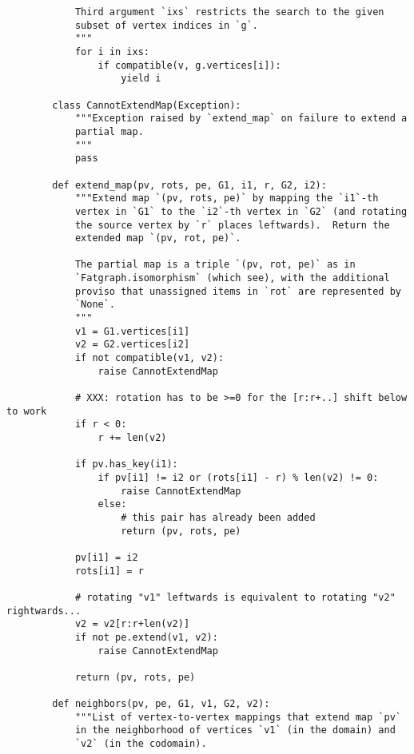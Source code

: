 \begin{lstlisting}
            Third argument `ixs` restricts the search to the given
            subset of vertex indices in `g`.
            """
            for i in ixs:
                if compatible(v, g.vertices[i]):
                    yield i

        class CannotExtendMap(Exception):
            """Exception raised by `extend_map` on failure to extend a
            partial map.
            """
            pass

        def extend_map(pv, rots, pe, G1, i1, r, G2, i2):
            """Extend map `(pv, rots, pe)` by mapping the `i1`-th
            vertex in `G1` to the `i2`-th vertex in `G2` (and rotating
            the source vertex by `r` places leftwards).  Return the
            extended map `(pv, rot, pe)`.

            The partial map is a triple `(pv, rot, pe)` as in
            `Fatgraph.isomorphism` (which see), with the additional
            proviso that unassigned items in `rot` are represented by
            `None`.
            """
            v1 = G1.vertices[i1]
            v2 = G2.vertices[i2]
            if not compatible(v1, v2):
                raise CannotExtendMap

            # XXX: rotation has to be >=0 for the [r:r+..] shift below to work
            if r < 0:
                r += len(v2)

            if pv.has_key(i1):
                if pv[i1] != i2 or (rots[i1] - r) % len(v2) != 0:
                    raise CannotExtendMap
                else:
                    # this pair has already been added
                    return (pv, rots, pe)

            pv[i1] = i2
            rots[i1] = r

            # rotating "v1" leftwards is equivalent to rotating "v2" rightwards...
            v2 = v2[r:r+len(v2)]
            if not pe.extend(v1, v2):
                raise CannotExtendMap

            return (pv, rots, pe)

        def neighbors(pv, pe, G1, v1, G2, v2):
            """List of vertex-to-vertex mappings that extend map `pv`
            in the neighborhood of vertices `v1` (in the domain) and
            `v2` (in the codomain).


\end{lstlisting}
